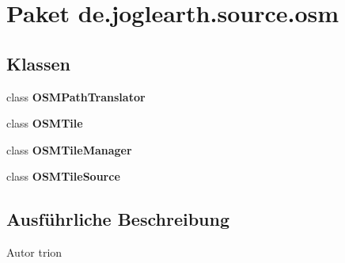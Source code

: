 \section{Paket de.\-joglearth.\-source.\-osm}
\label{namespacede_1_1joglearth_1_1source_1_1osm}
\subsection*{Klassen}
\begin{DoxyCompactItemize}
\item 
class {\bf O\-S\-M\-Path\-Translator}
\item 
class {\bf O\-S\-M\-Tile}
\item 
class {\bf O\-S\-M\-Tile\-Manager}
\item 
class {\bf O\-S\-M\-Tile\-Source}
\end{DoxyCompactItemize}


\subsection{Ausführliche Beschreibung}
\begin{DoxyAuthor}{Autor}
trion 
\end{DoxyAuthor}
